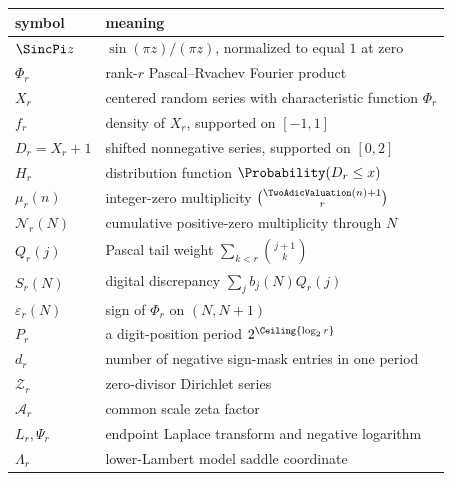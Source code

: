 \documentclass[11pt,oneside]{article}
\theoremstyle{definition}
\theoremstyle{remark}
\begin{document}
\begin{center}
\begin{tabularx}{\textwidth}{@{}lX@{}}
\toprule
symbol & meaning\\
\midrule
$\SincPi z$ & $\sin(\pi z)/(\pi z)$, normalized to equal $1$ at zero\\
$\Phi_r$ & rank-$r$ Pascal--Rvachev Fourier product\\
$X_r$ & centered random series with characteristic function $\Phi_r$\\
$f_r$ & density of $X_r$, supported on $[-1,1]$\\
$D_r=X_r+1$ & shifted nonnegative series, supported on $[0,2]$\\
$H_r$ & distribution function $\Probability(D_r\le x)$\\
$\mu_r(n)$ & integer-zero multiplicity $\binom{\TwoAdicValuation(n)+1}{r}$\\
$\mathcal N_r(N)$ & cumulative positive-zero multiplicity through $N$\\
$Q_r(j)$ & Pascal tail weight $\sum_{k<r}\binom{j+1}{k}$\\
$S_r(N)$ & digital discrepancy $\sum_jb_j(N)Q_r(j)$\\
$\varepsilon_r(N)$ & sign of $\Phi_r$ on $(N,N+1)$\\
$P_r$ & a digit-position period $2^{\Ceiling{\log_2r}}$\\
$d_r$ & number of negative sign-mask entries in one period\\
$\mathcal Z_r$ & zero-divisor Dirichlet series\\
$\mathcal A_r$ & common scale zeta factor\\
$L_r,\Psi_r$ & endpoint Laplace transform and negative logarithm\\
$\Lambda_r$ & lower-Lambert model saddle coordinate\\
\bottomrule
\end{tabularx}
\end{center}
\end{document}
